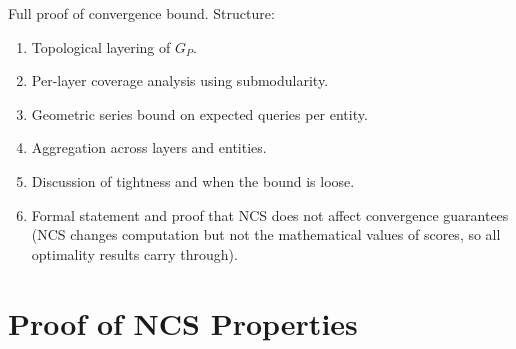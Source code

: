 \documentclass[11pt,a4paper]{article}
\newcommand{\placeholder}[1]{%
  \begin{tcolorbox}[colback=yellow!10,colframe=orange!60!black,
    fonttitle=\bfseries,title=Placeholder]
    #1
  \end{tcolorbox}%
}
\begin{document}
\placeholder{%
  Full proof of convergence bound. Structure:
  \begin{enumerate}[noitemsep]
    \item Topological layering of $G_P$.
    \item Per-layer coverage analysis using submodularity.
    \item Geometric series bound on expected queries per entity.
    \item Aggregation across layers and entities.
    \item Discussion of tightness and when the bound is loose.
    \item Formal statement and proof that NCS does not affect
          convergence guarantees (NCS changes computation but not
          the mathematical values of scores, so all optimality
          results carry through).
  \end{enumerate}
}

\section{Proof of NCS Properties}
\label{app:ncs_proofs}
\end{document}
